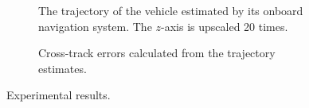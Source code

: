 \begin{figure}[t]
    \begin{subfigure}{0.48\textwidth}
        
        \caption{The trajectory of the vehicle estimated by its onboard navigation system. The $z$-axis is upscaled 20 times.}
        \label{fig:experiment_trajectory}
    \end{subfigure}      
    \hspace*{\fill}  
    \begin{subfigure}{0.4\textwidth}
        \hspace*{-5.5mm}
        
        \caption{Cross-track errors calculated from the trajectory estimates.}
        \label{fig:experiment_errors}
    \end{subfigure}
    \vspace*{-2mm}
    \caption{Experimental results.
    }
    \label{fig:experiment}
\end{figure}

